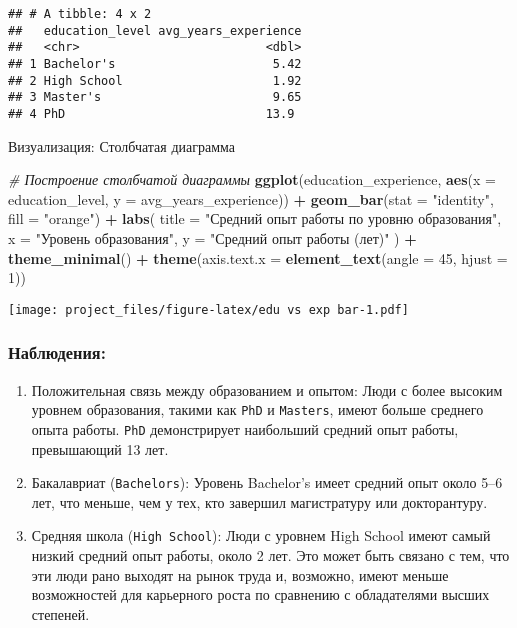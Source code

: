 \documentclass[
]{article}
\newenvironment{Shaded}{\begin{snugshade}}{\end{snugshade}}
\newcommand{\AttributeTok}[1]{\textcolor[rgb]{0.13,0.29,0.53}{#1}}
\newcommand{\CommentTok}[1]{\textcolor[rgb]{0.56,0.35,0.01}{\textit{#1}}}
\newcommand{\DecValTok}[1]{\textcolor[rgb]{0.00,0.00,0.81}{#1}}
\newcommand{\FunctionTok}[1]{\textcolor[rgb]{0.13,0.29,0.53}{\textbf{#1}}}
\newcommand{\NormalTok}[1]{#1}
\newcommand{\SpecialCharTok}[1]{\textcolor[rgb]{0.81,0.36,0.00}{\textbf{#1}}}
\newcommand{\StringTok}[1]{\textcolor[rgb]{0.31,0.60,0.02}{#1}}
\begin{document}
\begin{verbatim}
## # A tibble: 4 x 2
##   education_level avg_years_experience
##   <chr>                          <dbl>
## 1 Bachelor's                      5.42
## 2 High School                     1.92
## 3 Master's                        9.65
## 4 PhD                            13.9
\end{verbatim}

Визуализация: Столбчатая диаграмма

\begin{Shaded}
\begin{Highlighting}[]
\CommentTok{\# Построение столбчатой диаграммы}
\FunctionTok{ggplot}\NormalTok{(education\_experience, }\FunctionTok{aes}\NormalTok{(}\AttributeTok{x =}\NormalTok{ education\_level, }\AttributeTok{y =}\NormalTok{ avg\_years\_experience)) }\SpecialCharTok{+}
  \FunctionTok{geom\_bar}\NormalTok{(}\AttributeTok{stat =} \StringTok{"identity"}\NormalTok{, }\AttributeTok{fill =} \StringTok{"orange"}\NormalTok{) }\SpecialCharTok{+}
  \FunctionTok{labs}\NormalTok{(}
    \AttributeTok{title =} \StringTok{"Средний опыт работы по уровню образования"}\NormalTok{,}
    \AttributeTok{x =} \StringTok{"Уровень образования"}\NormalTok{,}
    \AttributeTok{y =} \StringTok{"Средний опыт работы (лет)"}
\NormalTok{  ) }\SpecialCharTok{+}
  \FunctionTok{theme\_minimal}\NormalTok{() }\SpecialCharTok{+}
  \FunctionTok{theme}\NormalTok{(}\AttributeTok{axis.text.x =} \FunctionTok{element\_text}\NormalTok{(}\AttributeTok{angle =} \DecValTok{45}\NormalTok{, }\AttributeTok{hjust =} \DecValTok{1}\NormalTok{))}
\end{Highlighting}
\end{Shaded}

\texttt{[image: project\_files/figure-latex/edu vs exp bar-1.pdf]}

\subsubsection{Наблюдения:}\label{ux43dux430ux431ux43bux44eux434ux435ux43dux438ux44f-12}

\begin{enumerate}
\def\labelenumi{\arabic{enumi}.}
\item
  Положительная связь между образованием и опытом: Люди с более высоким
  уровнем образования, такими как \texttt{PhD} и
  \texttt{Master\textquotesingle{}s}, имеют больше среднего опыта
  работы. \texttt{PhD} демонстрирует наибольший средний опыт работы,
  превышающий 13 лет.
\item
  Бакалавриат (\texttt{Bachelor\textquotesingle{}s}): Уровень Bachelor's
  имеет средний опыт около 5--6 лет, что меньше, чем у тех, кто завершил
  магистратуру или докторантуру.
\item
  Средняя школа (\texttt{High\ School}): Люди с уровнем High School
  имеют самый низкий средний опыт работы, около 2 лет. Это может быть
  связано с тем, что эти люди рано выходят на рынок труда и, возможно,
  имеют меньше возможностей для карьерного роста по сравнению с
  обладателями высших степеней.
\end{enumerate}
\end{document}

